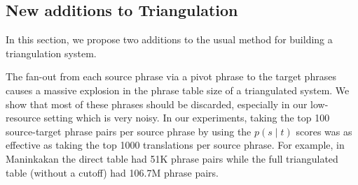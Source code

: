 \documentclass[11pt]{article}
\begin{document}
\subsection{New additions to Triangulation}
In this section, we propose two additions to the usual method for building a triangulation system.

 \label{sec:topn} The fan-out from each source phrase via a pivot phrase to the target phrases causes a massive explosion in the phrase table size of a triangulated system. We show that most of these phrases should be discarded, especially in our low-resource setting which is very noisy. In our experiments, taking the top 100 source-target phrase pairs per source phrase by using the $p(s \mid t)$ scores was as effective as taking the top 1000 translations per source phrase. For example, in Maninkakan the direct table had 51K phrase pairs while the full triangulated table (without a cutoff) had 106.7M phrase pairs.
\end{document}
